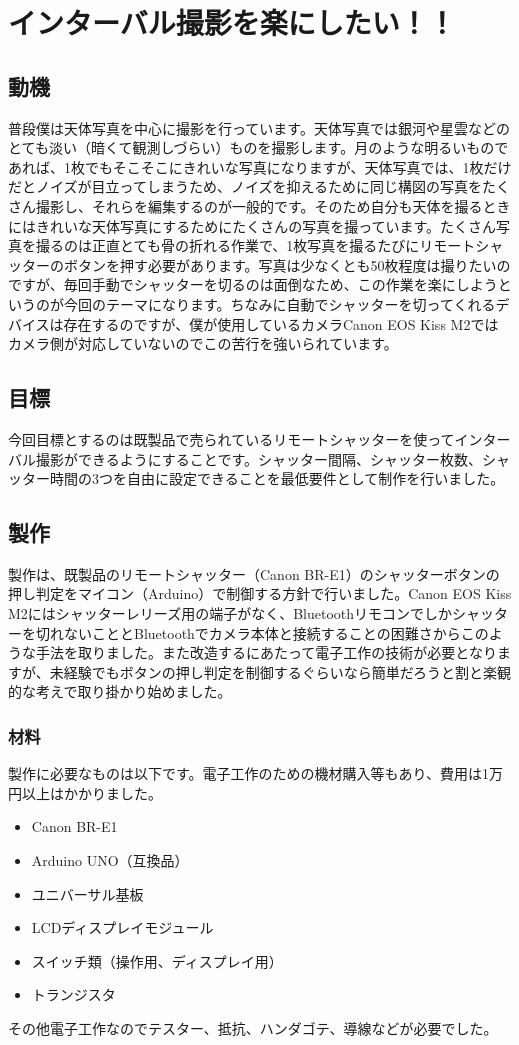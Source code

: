\documentclass[../main]{subfiles}
\begin{document}
\chapter{インターバル撮影を楽にしたい！！} %
\section{動機}
普段僕は天体写真を中心に撮影を行っています。天体写真では銀河や星雲などのとても淡い（暗くて観測しづらい）ものを撮影します。月のような明るいものであれば、1枚でもそこそこにきれいな写真になりますが、天体写真では、1枚だけだとノイズが目立ってしまうため、ノイズを抑えるために同じ構図の写真をたくさん撮影し、それらを編集するのが一般的です。そのため自分も天体を撮るときにはきれいな天体写真にするためにたくさんの写真を撮っています。たくさん写真を撮るのは正直とても骨の折れる作業で、1枚写真を撮るたびにリモートシャッターのボタンを押す必要があります。写真は少なくとも50枚程度は撮りたいのですが、毎回手動でシャッターを切るのは面倒なため、この作業を楽にしようというのが今回のテーマになります。ちなみに自動でシャッターを切ってくれるデバイスは存在するのですが、僕が使用しているカメラCanon EOS Kiss M2ではカメラ側が対応していないのでこの苦行を強いられています。

\section{目標}
今回目標とするのは既製品で売られているリモートシャッターを使ってインターバル撮影ができるようにすることです。シャッター間隔、シャッター枚数、シャッター時間の3つを自由に設定できることを最低要件として制作を行いました。

\section{製作}
製作は、既製品のリモートシャッター（Canon BR-E1）のシャッターボタンの押し判定をマイコン（Arduino）で制御する方針で行いました。Canon EOS Kiss M2にはシャッターレリーズ用の端子がなく、Bluetoothリモコンでしかシャッターを切れないこととBluetoothでカメラ本体と接続することの困難さからこのような手法を取りました。また改造するにあたって電子工作の技術が必要となりますが、未経験でもボタンの押し判定を制御するぐらいなら簡単だろうと割と楽観的な考えで取り掛かり始めました。

\subsection{材料}
製作に必要なものは以下です。電子工作のための機材購入等もあり、費用は1万円以上はかかりました。
\begin{itemize}
\item Canon BR-E1
\item Arduino UNO（互換品）
\item ユニバーサル基板
\item LCDディスプレイモジュール
\item スイッチ類（操作用、ディスプレイ用）
\item トランジスタ
\end{itemize}
その他電子工作なのでテスター、抵抗、ハンダゴテ、導線などが必要でした。
\end{document}
